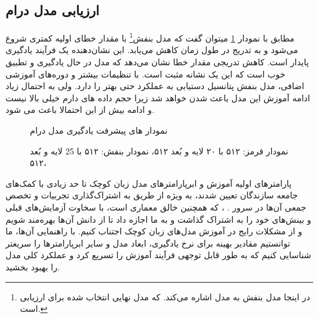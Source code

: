 \subsection{ارزیابی مدل درام}
مطابق با نمودار \ref{Fig:lrdr} میتوان گفت که
مدل بنفش\footnote{در اینجا مدل بنفش به مدل   اشاره می‌کند. که مدل نهایی انتخاب شده برای ارزیابی است.} با مقدار خطای اولیه کمتری شروع می‌شود و به تدریج در طول زمان کاهش می‌یابد. این نشان‌دهنده یک فرآیند یادگیری پایدار است.
کاهش تدریجی مقدار خطا نشان می‌دهد که مدل در حال یادگیری و تطبیق خوب است که این یک نشانه مثبت است. با تنظیمات بیشتر و دوره‌های آموزشی اضافی، مدل بنفش پتانسیل دستیابی به عملکرد حتی بهتر را دارد. ولی به احتمال زیاد ادامه آموزش این مدل باعث  شدن خواهد شد زیرا حجم داده های دارم خیلی بالا نیست و ادامه بیش از این احتمالا باعث  می شود.

\begin{figure}
      \centering
      \qquad
      \caption{نمودار های پیشرفت یادگیری مدل درام}
      \vspace{0.8em}
      \caption*{
            نمودار قرمز:  ۵۱۲ با ۲۰ لایه و بُعد ۵۱۲،
            نمودار بنفش: ۵۱۲ با 25 لایه و بُعد ۵۱۲،
      }
      \label{Fig:lrdr}
\end{figure}

پارامترهای اولیه آموزش و ابرپارامترهای مدل زبان کوچک تا حد زیادی با کمک‌های جامعه سازندگان  تعیین شدند، به ویژه از طریق به اشتراک‌گذاری تجربیات و تخصص جمعی آن‌ها در سرور . ، که همچنین خالق معماری  است، با سخاوت آزمایش‌های قبلی و بینش‌های خود را به اشتراک گذاشت و به ما اجازه داد تا از دانش آن‌ها بهره‌مند شویم و از مشکلات رایج در آموزش مدل‌های زبان کوچک اجتناب کنیم. با راهنمایی آن‌ها، ما توانستیم مقادیر بهینه برای نرخ یادگیری، ابعاد مدل و سایر ابرپارامترها را سریعتر شناسایی کنیم که به طور قابل توجهی فرآیند آموزش را تسریع کرد و عملکرد کلی مدل را بهبود بخشید.

